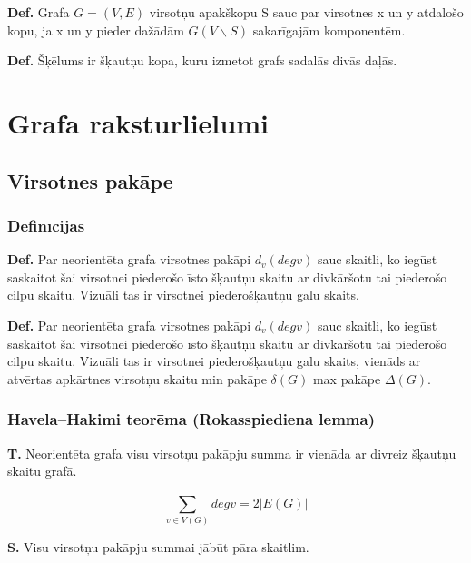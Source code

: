 \documentclass{article}
\begin{document}
\textbf{Def.}  Grafa $G = (V, E)$ virsotņu apakškopu S sauc par virsotnes x un y atdalošo kopu, ja x un y pieder dažādām $G(V \backslash S)$ sakarīgajām komponentēm.

\textbf{Def.} Šķēlums ir šķautņu kopa, kuru izmetot grafs sadalās divās daļās.

\section{Grafa raksturlielumi}

\subsection{Virsotnes pakāpe}

\subsubsection{Definīcijas}

\textbf{Def.}  Par neorientēta grafa virsotnes pakāpi $d_v (degv)$ sauc skaitli, ko iegūst saskaitot šai virsotnei piederošo īsto šķautņu skaitu ar divkāršotu tai piederošo cilpu skaitu. Vizuāli tas ir virsotnei piederošķautņu galu skaits.

\textbf{Def.}  Par neorientēta grafa virsotnes pakāpi $d_v (degv )$ sauc skaitli, ko iegūst saskaitot šai virsotnei piederošo īsto šķautņu skaitu ar divkāršotu tai piederošo cilpu skaitu.  Vizuāli tas ir virsotnei piederošķautņu galu skaits, vienāds ar atvērtas apkārtnes virsotņu skaitu min pakāpe $\delta(G )$ max pakāpe $\Delta(G )$.

\subsubsection{Havela–Hakimi teorēma (Rokasspiediena lemma)}

\textbf{T.} Neorientēta grafa visu virsotņu pakāpju summa ir vienāda ar divreiz šķautņu skaitu grafā.

\begin{equation}
	\sum_{ v \in V (G)}^{} degv = 2 | E(G) | 
\end{equation}

\textbf{S.} Visu virsotņu pakāpju summai jābūt pāra skaitlim. 
\end{document}

